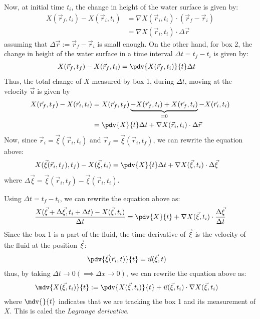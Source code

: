 Now, at initial time $t_i$, the change in height of the water surface is given by:
\begin{align}
  X(\vec{r}_f, t_i) - X(\vec{r}_i, t_i) & = \nabla X(\vec{r}_i, t_i) \cdot (\vec{r}_f - \vec{r}_i) \\
                                        & = \nabla X(\vec{r}_i, t_i) \cdot \Delta \vec{r}
\end{align}
assuming that $\Delta \vec{r} := \vec{r}_f - \vec{r}_i$ is small enough.
On the other hand, for box 2, the change in height of the water surface in a time interval $\Delta t = t_f - t_i$ is given by:
\begin{align}
  X(\vec{r}_f, t_f) - X(\vec{r}_f, t_i) & = \pdv{X(\vec{r}_f, t_i)}{t} \Delta t
\end{align}
Thus, the total change of $X$ measured by box 1, during $\Delta t$, moving at the velocity $\vec{u}$ is given by
\begin{align}
  X(\vec{r}_f, t_f) - X(\vec{r}_i, t_i)
   & = X(\vec{r}_f, t_f) \underbrace{
    - X(\vec{r}_f, t_i)
    + X(\vec{r}_f, t_i)
  }_{=0} - X(\vec{r}_i, t_i)                                               \\
   & = \pdv{X}{t} \Delta t + \nabla X(\vec{r}_i, t_i) \cdot \Delta \vec{r}
\end{align}
Now, since $\vec{r}_i = \vec{\xi}(\vec{r}_i, t_i)$ and $\vec{r}_f = \vec{\xi}(\vec{r}_i, t_f)$, we can rewrite the equation above:
\begin{align}
  X(\vec{\xi}(\vec{r}_i, t_f), t_f) - X(\vec{\xi}, t_i) & = \pdv{X}{t} \Delta t + \nabla X(\vec{\xi}, t_i) \cdot \Delta \vec{\xi}
\end{align}
where $\Delta \vec{\xi} = \vec{\xi}(\vec{r}_i, t_f) - \vec{\xi}(\vec{r}_i, t_i)$.

Using $\Delta t = t_f - t_i$, we can rewrite the equation above as:
\begin{align}
  \frac{X(\vec{\xi} + \Delta \vec{\xi}, t_i + \Delta t) - X(\vec{\xi}, t_i)}{\Delta t}
   & = \pdv{X}{t} + \nabla X(\vec{\xi}, t_i) \cdot \frac{\Delta \vec{\xi}}{\Delta t} \\
\end{align}
Since the box 1 is a part of the fluid, the time derivative of $\vec{\xi}$ is the velocity of the fluid at the position $\vec{\xi}$:
\begin{align}
  \pdv{\vec{\xi}(\vec{r}_i, t)}{t} & = \vec{u}(\vec{\xi}, t)
\end{align}
thus, by taking $\Delta t \to 0 (\implies \Delta x \to 0)$, we can rewrite the equation above as:
\begin{align}
  \mdv{X(\vec{\xi}, t_i)}{t} & := \pdv{X(\vec{\xi}, t_i)}{t} + \vec{u}(\vec{\xi}, t_i) \cdot  \nabla X(\vec{\xi}, t_i)
\end{align}
where $\mdv{}{t}$ indicates that we are tracking the box 1 and its measurement of $X$.
This is caled the \emph{Lagrange derivative}.

